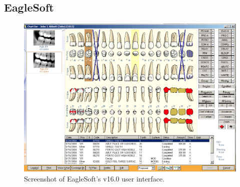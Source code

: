 \documentclass[11pt]{article}
\begin{document}
\newpage
\subsection{EagleSoft}
\label{ES}
\begin{figure}[h]
\begin{center}
\includegraphics[width=\textwidth]{esss.png}
\end{center}
\caption{Screenshot of EagleSoft's v16.0 user interface.}
\end{figure}

\newpage
\end{document}

